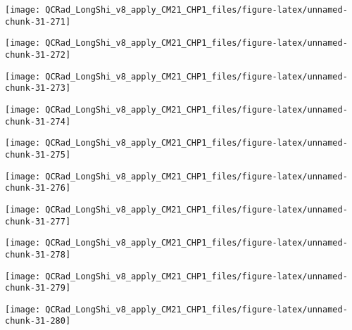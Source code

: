 \documentclass[
  10pt,
  a4paper,oneside]{article}
\begin{document}
\begin{center}\texttt{[image: QCRad\_LongShi\_v8\_apply\_CM21\_CHP1\_files/figure-latex/unnamed-chunk-31-271]} \end{center}

\begin{center}\texttt{[image: QCRad\_LongShi\_v8\_apply\_CM21\_CHP1\_files/figure-latex/unnamed-chunk-31-272]} \end{center}

\begin{center}\texttt{[image: QCRad\_LongShi\_v8\_apply\_CM21\_CHP1\_files/figure-latex/unnamed-chunk-31-273]} \end{center}

\begin{center}\texttt{[image: QCRad\_LongShi\_v8\_apply\_CM21\_CHP1\_files/figure-latex/unnamed-chunk-31-274]} \end{center}

\begin{center}\texttt{[image: QCRad\_LongShi\_v8\_apply\_CM21\_CHP1\_files/figure-latex/unnamed-chunk-31-275]} \end{center}

\begin{center}\texttt{[image: QCRad\_LongShi\_v8\_apply\_CM21\_CHP1\_files/figure-latex/unnamed-chunk-31-276]} \end{center}

\begin{center}\texttt{[image: QCRad\_LongShi\_v8\_apply\_CM21\_CHP1\_files/figure-latex/unnamed-chunk-31-277]} \end{center}

\begin{center}\texttt{[image: QCRad\_LongShi\_v8\_apply\_CM21\_CHP1\_files/figure-latex/unnamed-chunk-31-278]} \end{center}

\begin{center}\texttt{[image: QCRad\_LongShi\_v8\_apply\_CM21\_CHP1\_files/figure-latex/unnamed-chunk-31-279]} \end{center}

\begin{center}\texttt{[image: QCRad\_LongShi\_v8\_apply\_CM21\_CHP1\_files/figure-latex/unnamed-chunk-31-280]} \end{center}
\end{document}
